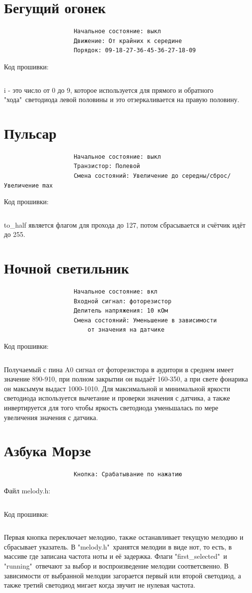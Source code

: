 \section{Бегущий огонек}
\begin{verbatim}
					Начальное состояние: выкл
					Движение: От крайних к середине
					Порядок: 09-18-27-36-45-36-27-18-09
\end{verbatim}
Код прошивки:
\inputminted{cpp}{z1/main.cpp}
i - это число от 0 до 9, которое используется для прямого и обратного "хода"\ светодиода левой половины и это отзеркаливается на правую половину.
\section{Пульсар}
\begin{verbatim}
					Начальное состояние: выкл
					Транзистор: Полевой
					Смена состояний: Увеличение до середны/сброс/Увеличение max
\end{verbatim}
Код прошивки:
\inputminted{cpp}{z2/main.cpp}
to\_half является флагом для прохода до 127, потом сбрасывается и счётчик идёт до 255.
\section{Ночной светильник}
\begin{verbatim}
					Начальное состояние: вкл
					Входной сигнал: фоторезистор
					Делитель напряжения: 10 кОм
					Смена состояний: Уменьшение в зависимости
						от значения на датчике
\end{verbatim}
Код прошивки:
\inputminted{cpp}{z3/main.cpp}
Получаемый с пина A0 сигнал от фоторезистора в аудитори в среднем имеет значение 890-910, при полном закрытии он выдаёт 160-350, а при свете фонарика он максымум выдаст 1000-1010. Для максимальной и минимальной яркости светодиода используется вычетание и проверки значения с датчика, а также инвертируется для того чтобы яркость светодиода уменьшалась по мере увеличения значения с датчика.
\section{Азбука Морзе}
\begin{verbatim}
					Кнопка: Срабатывание по нажатию
\end{verbatim}
Файл melody.h:
\inputminted{cpp}{z4/melody.h}
Код прошивки:
\inputminted{cpp}{z4/main.cpp}
Первая кнопка переключает мелодию, также останавливает текущую мелодию и сбрасывает указатель. В "melody.h"\ хранятся мелодии в виде нот, то есть, в массиве где записана частота ноты и её задержка. Флаги "first\_selected"\ и "running"\ отвечают за выбор и воспроизведение мелодии соответсвенно. В зависимости от выбранной мелодии загорается первый или второй светодиод, а также третий светодиод мигает когда звучит не нулевая частота.
